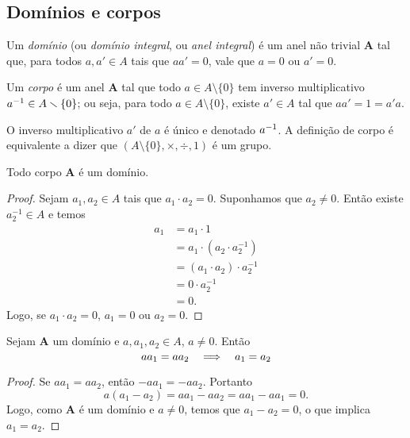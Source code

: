\subsection{Domínios e corpos}



\begin{definition}
Um \emph{domínio} (ou \emph{domínio integral}, ou \emph{anel integral}) é um anel não trivial $\bm A$ tal que, para todos $a,a' \in A$ tais que $aa' = 0$, vale que $a=0$ ou $a'=0$.
\end{definition}

\begin{definition}
Um \emph{corpo} é um anel $\bm A$ tal que todo $a \in A \setminus \{0\}$ tem inverso multiplicativo $a^{-1} \in A \smallsetminus \{0\}$; ou seja, para todo $a \in A \setminus \{0\}$, existe $a' \in A$ tal que $aa'=1=a'a$.
\end{definition}

O inverso multiplicativo $a'$ de $a$ é único e denotado $a^{-1}$. A definição de corpo é equivalente a dizer que $(A \setminus \{0\},\times,\div,1)$ é um grupo.

\begin{proposition}
\label{prop:corp.dom}
Todo corpo $\bm A$ é um domínio.
\end{proposition}
\begin{proof}
	Sejam $a_1,a_2 \in A$ tais que $a_1 \cdot a_2=0$. Suponhamos que $a_2 \neq 0$. Então existe $a_2^{-1} \in A$ e temos
	\begin{equation*}
	\begin{split}
	a_1 &= a_1 \cdot 1 \\
		&= a_1 \cdot (a_2 \cdot a_2^{-1}) \\
		&= (a_1 \cdot a_2) \cdot a_2^{-1}\\
		&= 0 \cdot a_2^{-1} \\
		&= 0.
	\end{split}
	\end{equation*}
	Logo, se $a_1 \cdot a_2=0$, $a_1=0$ ou $a_2=0$.
\end{proof}

\begin{proposition}
Sejam $\bm A$ um domínio e $a,a_1,a_2 \in A$, $a \neq 0$. Então
	\begin{equation*}
	aa_1 = aa_2 \quad \Longrightarrow \quad a_1=a_2
	\end{equation*}
\end{proposition}
\begin{proof}
	Se $aa_1 = aa_2$, então $-aa_1 = -aa_2$. Portanto
	\begin{equation*}
	a(a_1-a_2) = aa_1 -aa_2 = aa_1 -aa_1 = 0.
	\end{equation*}
Logo, como $\bm A$ é um domínio e $a \neq 0$, temos que $a_1-a_2=0$, o que implica $a_1=a_2$.
\end{proof}

